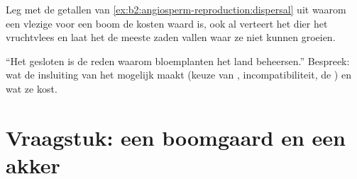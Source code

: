\begin{exercise}[$\star\star\star$]\label{exo:b2:angiosperm-reproduction:11}
Leg met de getallen van \cref{ex:b2:angiosperm-reproduction:dispersal}
uit waarom een vlezige  voor een boom de kosten waard is, ook al
verteert het dier het vruchtvlees en laat het de meeste zaden vallen waar
ze niet kunnen groeien.
\end{exercise}

\begin{exercise}[$\star\star\star$]\label{exo:b2:angiosperm-reproduction:12}
``Het gesloten  is de reden waarom bloemplanten het land
beheersen.'' Bespreek: wat de insluiting van het  mogelijk
maakt (keuze van , incompatibiliteit, de ) en wat ze kost.
\end{exercise}

\section{Vraagstuk: een boomgaard en een akker}

